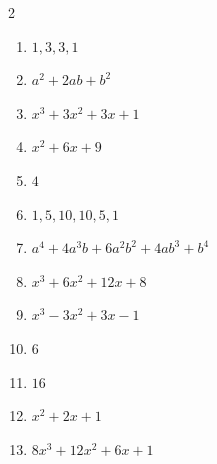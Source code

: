 \documentclass[11pt]{article}
\begin{document}
\begin{keybox}
\begin{multicols}{2}
\small
\begin{enumerate}[leftmargin=*,itemsep=3pt]
  \item $1,3,3,1$
  \item $a^2+2ab+b^2$
  \item $x^3+3x^2+3x+1$
  \item $x^2+6x+9$
  \item $4$
  \item $1,5,10,10,5,1$
  \item $a^4+4a^3b+6a^2b^2+4ab^3+b^4$
  \item $x^3+6x^2+12x+8$
  \item $x^3-3x^2+3x-1$
  \item $6$
  \item $16$
  \item $x^2+2x+1$
  \item $8x^3+12x^2+6x+1$
\end{enumerate}
\end{multicols}
\end{keybox}
\end{document}
